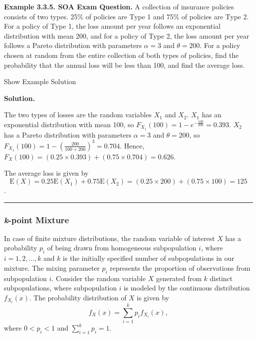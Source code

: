 \documentclass[]{book}
\theoremstyle{definition}
\theoremstyle{definition}
\theoremstyle{definition}
\theoremstyle{remark}
\begin{document}
\textbf{Example 3.3.5. SOA Exam Question.} A collection of insurance
policies consists of two types. 25\% of policies are Type 1 and 75\% of
policies are Type 2. For a policy of Type 1, the loss amount per year
follows an exponential distribution with mean 200, and for a policy of
Type 2, the loss amount per year follows a Pareto distribution with
parameters \(\alpha=3\) and \(\theta=200\). For a policy chosen at
random from the entire collection of both types of policies, find the
probability that the annual loss will be less than 100, and find the
average loss.

Show Example Solution

\hypertarget{toggleExampleLoss.3.5}{}
\textbf{Solution.}

The two types of losses are the random variables \(X_1\) and \(X_2\).
\(X_1\) has an exponential distribution with mean 100, so
\(F_{X_1}\left(100\right)=1-e^{-\frac{100}{200}}=0.393\). \(X_2\) has a
Pareto distribution with parameters \(\alpha=3\) and \(\theta=200\), so
\(F_{X_1}\left(100\right)=1-\left(\frac{200}{100+200}\right)^3=0.704\).
Hence,
\(F_X\left(100\right)=\left(0.25\times0.393\right)+\left(0.75\times0.704\right)=0.626\).

The average loss is given by
\[\mathrm{E}\left(X\right)=0.25\mathrm{E}\left(X_1\right)+0.75\mathrm{E}\left(X_2\right)=\left(0.25\times200\right)+\left(0.75\times100\right)=125\].

\begin{center}\rule{0.5\linewidth}{\linethickness}\end{center}

\subsubsection{\texorpdfstring{\emph{k}-point
Mixture}{k-point Mixture}}\label{k-point-mixture}

In case of finite mixture distributions, the random variable of interest
\(X\) has a probability \(p_{i}\) of being drawn from homogeneous
subpopulation \(i\), where \(i = 1,2,\ldots,k\) and \(k\) is the
initially specified number of subpopulations in our mixture. The mixing
parameter \(p_{i}\) represents the proportion of observations from
subpopulation \(i\). Consider the random variable \(X\) generated from
\(k\) distinct subpopulations, where subpopulation \(i\) is modeled by
the continuous distribution \(f_{X_{i}}\left( x \right)\). The
probability distribution of \(X\) is given by
\[f_{X}\left( x \right) = \sum_{i = 1}^{k}{p_{i}f_{X_{i}}\left( x \right)},\]
where \(0 < p_{i} < 1\) and \(\sum_{i = 1}^{k} p_{i} = 1\).
\end{document}
